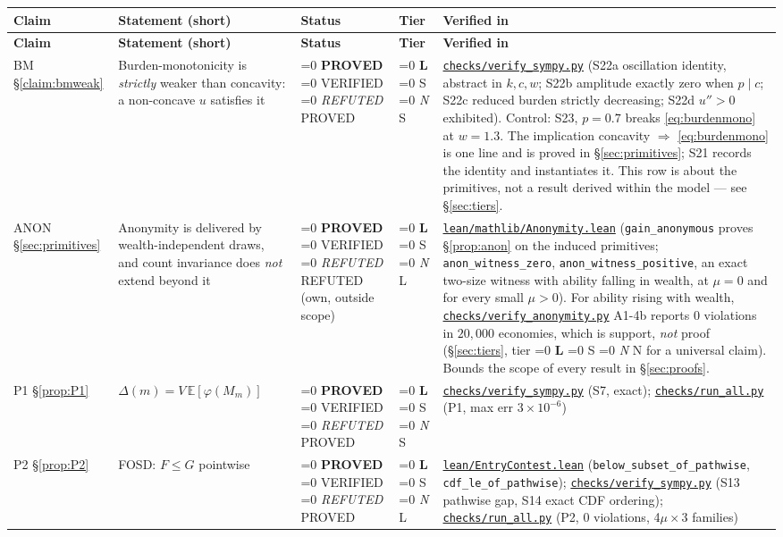 \documentclass[11pt]{article}
\newcommand{\file}[1]{\href{run:#1}{\texttt{#1}}}
\newcommand{\status}[1]{%
  \ifnum\pdfstrcmp{#1}{PROVED}=0 \textbf{PROVED}%
  \else\ifnum\pdfstrcmp{#1}{VERIFIED}=0 VERIFIED%
  \else\ifnum\pdfstrcmp{#1}{REFUTED}=0 \emph{REFUTED}%
  \else #1\fi\fi\fi}
\newcommand{\tier}[1]{%
  \ifnum\pdfstrcmp{#1}{L}=0 \textbf{L}%
  \else\ifnum\pdfstrcmp{#1}{S}=0 S%
  \else\ifnum\pdfstrcmp{#1}{N}=0 \emph{N}%
  \else #1\fi\fi\fi}
\begin{document}
\begin{longtable}{@{}p{1.5cm}p{5.0cm}p{1.5cm}p{0.8cm}p{6.0cm}@{}}
\toprule
\textbf{Claim} & \textbf{Statement (short)} & \textbf{Status} & \textbf{Tier} & \textbf{Verified in} \\
\midrule
\endfirsthead
\toprule
\textbf{Claim} & \textbf{Statement (short)} & \textbf{Status} & \textbf{Tier} & \textbf{Verified in} \\
\midrule
\endhead
\bottomrule
\endfoot
BM \S\ref{claim:bmweak} & Burden-monotonicity is \emph{strictly} weaker than
  concavity: a non-concave $u$ satisfies it &
  \status{PROVED} & \tier{S} &
  \file{checks/verify\_sympy.py} (S22a oscillation identity, abstract in
  $k,c,w$; S22b amplitude exactly zero when $p\mid c$; S22c reduced burden
  strictly decreasing; S22d $u''>0$ exhibited). Control: S23, $p=0.7$ breaks
  \eqref{eq:burdenmono} at $w=1.3$. The implication concavity
  $\Rightarrow$ \eqref{eq:burdenmono} is one line and is proved in
  \S\ref{sec:primitives}; S21 records the identity and instantiates it. This
  row is about the primitives, not a result derived within the model ---
  see \S\ref{sec:tiers}. \\[4pt]
ANON \S\ref{sec:primitives} & Anonymity is delivered by wealth-independent
  draws, and count invariance does \emph{not} extend beyond it &
  \status{REFUTED} (own, outside scope) & \tier{L} &
  \file{lean/mathlib/Anonymity.lean} (\texttt{gain\_anonymous} proves
  \S\ref{prop:anon} on the induced primitives; \texttt{anon\_witness\_zero},
  \texttt{anon\_witness\_positive}, an exact two-size witness with ability
  falling in wealth, at $\mu=0$ and for every small $\mu>0$). For ability
  rising with wealth, \file{checks/verify\_anonymity.py} A1-4b reports $0$
  violations in $20{,}000$ economies, which is support, \emph{not} proof
  (\S\ref{sec:tiers}, tier \tier{N} for a universal claim). Bounds the scope
  of every result in \S\ref{sec:proofs}. \\[4pt]
P1 \S\ref{prop:P1} & $\Delta(m)=V\,\mathbb E[\varphi(M_m)]$ &
  \status{PROVED} & \tier{S} &
  \file{checks/verify\_sympy.py} (S7, exact); \file{checks/run\_all.py} (P1, max err $3\times10^{-6}$) \\[4pt]
P2 \S\ref{prop:P2} & FOSD: $F\le G$ pointwise &
  \status{PROVED} & \tier{L} &
  \file{lean/EntryContest.lean} (\texttt{below\_subset\_of\_pathwise}, \texttt{cdf\_le\_of\_pathwise}); \file{checks/verify\_sympy.py} (S13 pathwise gap, S14 exact CDF ordering); \file{checks/run\_all.py} (P2, 0 violations, 4$\mu\times$3 families) \\[4pt]

\end{longtable}
\end{document}
